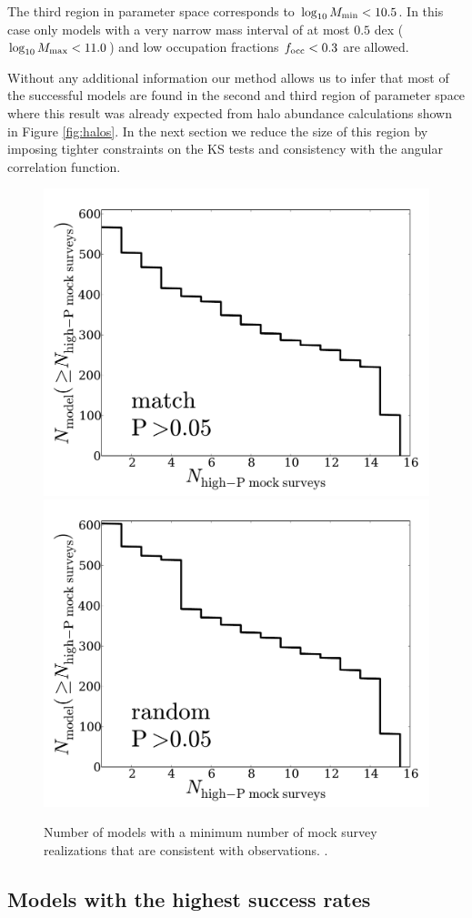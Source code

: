 \documentclass[usenatbib]{mn2e}
\begin{document}
The third region in parameter space corresponds to $\log_{10}M_{\rm
  min}<10.5$. In this case only models with a very narrow mass interval of
at most $0.5$ dex ($\log_{10}M_{\rm max}<11.0$) and low
occupation fractions $f_{\rm occ}<0.3$ are allowed. 

Without any additional information our method allows us to infer that
most of the successful models are found in the second and third region of
parameter space where this result was already expected from halo
abundance calculations shown in Figure \ref{fig:halos}. In the next
section we reduce the size of this region by imposing tighter
constraints on the KS tests and consistency with the angular
correlation function.

\begin{figure}
\begin{center}
\includegraphics[width=0.46\linewidth,angle=0]{./plots/Fig4_match_P5.pdf}
\hspace{5mm}
\includegraphics[width=0.46\linewidth,angle=0]{./plots/Fig4_random_P5.pdf}
\end{center} 
\caption{ Number of models with a minimum number of mock survey
  realizations that are consistent with observations.
  \label{fig:high_success_rate}.}  
\end{figure}
 
\subsection{Models with the highest success rates}
\end{document}
